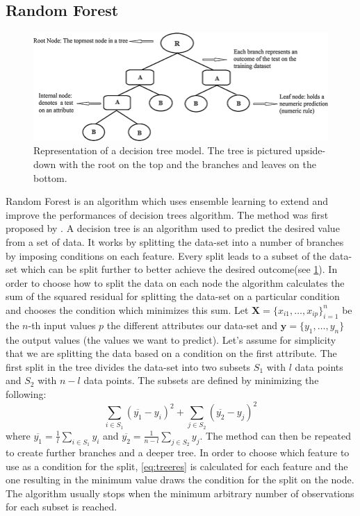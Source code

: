 \subsection{Random Forest}\label{random-forest}
\begin{figure}[!tp]
	\centering		  
	\includegraphics[width=1.\textwidth]{figures/decision_tree.png}
	\caption{Representation of a decision tree model. The tree is pictured upside-down with the root on the top and the branches and leaves on the bottom.}
	\label{fig:tree}
\end{figure}
Random Forest is an algorithm which uses ensemble learning to extend and improve the performances of decision trees algorithm. The method was first proposed by \citet{RandomHo1995}. A decision tree is an algorithm used to predict the desired value from a set of data. It works by splitting the data-set into a number of branches by imposing conditions on each feature. Every split leads to a subset of the data-set which can be split further to better achieve the desired outcome(see \ref{fig:tree}). In order to choose how to split the data on each node the algorithm calculates the sum of the squared residual for splitting the data-set on a particular condition and chooses the condition which minimizes this sum. Let $\bm{X} = \{x_{i1},\ldots ,x_{ip}\}_{i=1}^{n}$ be the $n$-th input values $p$ the different attributes  our data-set and $\mathbf{y} = \{y_{1},\ldots ,y_{n}\}$ the output values (the values we want to predict). Let's assume for simplicity that we are splitting the data based on a condition on the first attribute. The first split in the tree divides the data-set into two subsets $S_1$ with $l$ data points and $S_2$ with $n-l$ data points. The subsets are defined by minimizing the following:
\begin{equation}\label{eq:treeres}
\sum_{i \in S_1}(\overline{y_1}-y_i)^2 + \sum_{j \in S_2}(\overline{y_2}-y_j)^2
\end{equation}
where  $\overline{y_1} = \frac{1}{l}\sum_{i \in S_1}y_i$ and $\overline{y_2} = \frac{1}{n-l}\sum_{j \in S_2}y_j$. The method can then be repeated to create further branches and a deeper tree. In order to choose which feature to use as a condition for the split, \ref{eq:treeres} is calculated for each feature and the one resulting in the minimum value draws the condition for the split on the node. The algorithm usually stops when the minimum arbitrary number of observations for each subset is reached.

